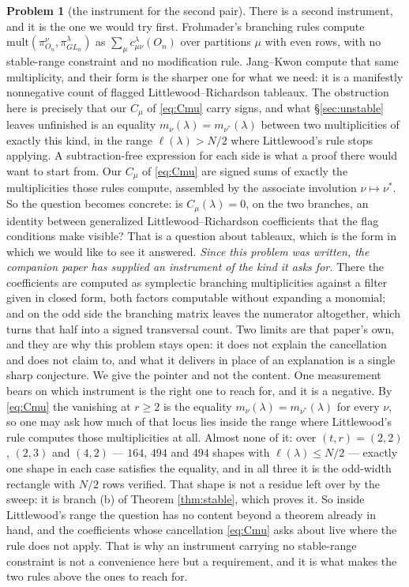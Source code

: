 \documentclass[11pt,reqno]{amsart}
\newcommand{\stverif}{\textcolor{hverif}{\small verified}}
\theoremstyle{plain}
\theoremstyle{definition}
\newtheorem{problem}[theorem]{Problem}
\begin{document}
\begin{problem}[the instrument for the second pair]
There is a second instrument, and it is the one we would try first. Frohmader's branching rules
\cite{Frohmader} compute $\mathrm{mult}(\pi^{\nu}_{O_n},\pi^{\lambda}_{GL_n})$ as
$\sum_{\mu}c^{\lambda}_{\mu\nu}(O_n)$ over partitions $\mu$ with even rows, with no stable-range
constraint and no modification rule. Jang--Kwon \cite{JK20} compute that same multiplicity, and
their form is the sharper one for what we need: it is a manifestly nonnegative count of flagged
Littlewood--Richardson tableaux. The obstruction here is precisely that our $C_\mu$ of
\eqref{eq:Cmu} carry signs, and what \S\ref{sec:unstable} leaves unfinished is an equality
$m_\nu(\lambda)=m_{\nu^{*}}(\lambda)$ between two multiplicities of exactly this kind, in the range
$\ell(\lambda)>N/2$ where Littlewood's rule stops applying. A subtraction-free expression for each
side is what a proof there would want to start from. Our $C_\mu$ of \eqref{eq:Cmu} are signed sums of exactly the
multiplicities those rules compute, assembled by the associate involution $\nu\mapsto\nu^{*}$. So the
question becomes concrete: is $C_\mu(\lambda)=0$, on the two branches, an identity between
generalized Littlewood--Richardson coefficients that the flag conditions make visible? That is a
question about tableaux, which is the form in which we would like to see it answered.
\emph{Since this problem was written, the companion paper \cite{PaperII} has supplied an instrument
of the kind it asks for.} There the coefficients are computed as symplectic branching multiplicities
against a filter given in closed form, both factors computable without expanding a monomial; and on
the odd side the branching matrix leaves the numerator altogether, which turns that half into a
signed transversal count. Two limits are that paper's own, and they are why this problem stays open:
it does not explain the cancellation and does not claim to, and what it delivers in place of an
explanation is a single sharp conjecture. We give the pointer and not the content.
One measurement bears on which instrument is the right one to reach for, and it is a negative. By
\eqref{eq:Cmu} the vanishing at $r\ge2$ is the equality $m_\nu(\lambda)=m_{\nu^{*}}(\lambda)$ for
every $\nu$, so one may ask how much of that locus lies inside the range where Littlewood's rule
computes those multiplicities at all. Almost none of it: over $(t,r)=(2,2)$, $(2,3)$ and $(4,2)$ ---
$164$, $494$ and $494$ shapes with $\ell(\lambda)\le N/2$ --- exactly one shape in each case
satisfies the equality, and in all three it is the odd-width rectangle with $N/2$ rows \stverif.
That shape is not a residue left over by the sweep: it is branch (b) of Theorem \ref{thm:stable},
which proves it. So inside Littlewood's range the question has no content beyond a theorem already
in hand, and the coefficients whose cancellation \eqref{eq:Cmu} asks about live where the rule does
not apply. That is why an instrument carrying no stable-range constraint is not a convenience here
but a requirement, and it is what makes the two rules above the ones to reach for.
\end{problem}
\end{document}
